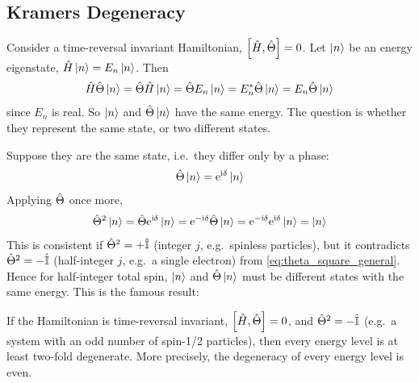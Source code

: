 \subsection{Kramers Degeneracy}

Consider a time-reversal invariant Hamiltonian, $\left[ \hat{H} , \hat{\Theta} \right] = 0$. Let $\ket{n}$ be an energy eigenstate, $\hat{H} \ket{n} = E_n \ket{n}$. Then
\begin{align*}
    \hat{H} \hat{\Theta} \ket{n} = \hat{\Theta} \hat{H} \ket{n} = \hat{\Theta} E_n \ket{n} = E_n^* \hat{\Theta} \ket{n} = E_n \hat{\Theta} \ket{n}
\end{align*}
since $E_n$ is real. So $\ket{n}$ and $\hat{\Theta} \ket{n}$ have the same energy. The question is whether they represent the same state, or two different states.

Suppose they are the same state, i.e.\ they differ only by a phase:
\begin{align*}
    \hat{\Theta} \ket{n} = \mathrm{e}^{\mathrm{i} \delta} \ket{n}
\end{align*}
Applying $\hat{\Theta}$ once more,
\begin{align*}
    \hat{\Theta}^2 \ket{n} = \hat{\Theta} \mathrm{e}^{\mathrm{i} \delta} \ket{n} = \mathrm{e}^{-\mathrm{i} \delta} \hat{\Theta} \ket{n} = \mathrm{e}^{-\mathrm{i} \delta} \mathrm{e}^{\mathrm{i} \delta} \ket{n} = \ket{n}
\end{align*}
This is consistent if $\hat{\Theta}^2 = + \hat{\mathbb{I}}$ (integer $j$, e.g.\ spinless particles), but it contradicts $\hat{\Theta}^2 = - \hat{\mathbb{I}}$ (half-integer $j$, e.g.\ a single electron) from \cref{eq:theta_square_general}. Hence for half-integer total spin, $\ket{n}$ and $\hat{\Theta} \ket{n}$ must be different states with the same energy. This is the famous result:
\begin{theorem}
    If the Hamiltonian is time-reversal invariant, $\left[ \hat{H} , \hat{\Theta} \right] = 0$, and $\hat{\Theta}^2 = - \hat{\mathbb{I}}$ (e.g.\ a system with an odd number of spin-1/2 particles), then every energy level is at least two-fold degenerate. More precisely, the degeneracy of every energy level is even.
\end{theorem}
